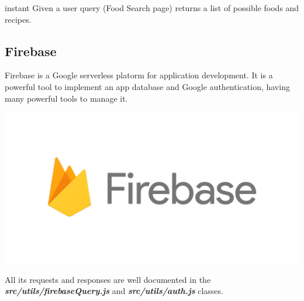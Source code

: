 \documentclass[12pt,hidelinks]{article}
\begin{document}
	\begin{docCommand}{instant}{}
		Given a user query (Food Search page) returns a list of possible foods and recipes.
\end{docCommand}
       
       

	\subsection{Firebase}
	    Firebase \cite{Firebase} is a Google serverless platorm for application development. 
        It is a powerful tool to implement an app database and Google authentication, having many powerful tools to manage it.
		\begin{center}
			\includegraphics[scale=0.2]{Firebase}
		\end{center}
		All its requests and responses are well documented in the \textbf{\emph{src/utils/firebaseQuery.js}} and \textbf{\emph{src/utils/auth.js}} classes.
		
\newpage
\end{document}
